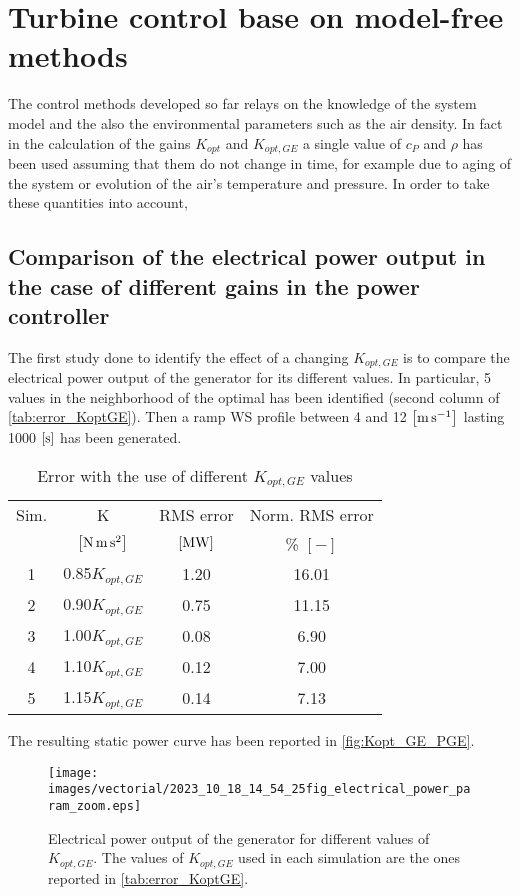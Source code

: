\section{Turbine control base on model-free methods}\label{sec:c_other_controls}
The control methods developed so far relays on the knowledge of the system model and the also the environmental parameters such as the air density. In fact in the calculation of the gains $K_{opt}$ and $K_{opt,GE}$ a single value of $c_P$ and $\rho$ has been used assuming that them do not change in time, for example due to aging of the system or evolution of the air's temperature and pressure. In order to take these quantities into account,  

\subsection{Comparison of the electrical power output in the case of different gains in the power controller}\label{subsec:c_different_KoptGE}
The first study done to identify the effect of a changing $K_{opt,GE}$ is to compare the electrical power output of the generator for its  different values. In particular, 5 values in the neighborhood of the optimal has been identified (second column of \autoref{tab:error_KoptGE}). Then a ramp WS profile between 4 and 12 $\left[\si{\meter\per\second}\right]$ lasting 1000 $\left[\si{\second}\right]$ has been generated.
\begin{table}[htb]
  \centering
  \begin{tabular}{cc|cc}
  \toprule
  Sim. & K & RMS error & Norm. RMS error\\ 
   &  $\left[\si{\newton \meter \square \second}\right]$ & $\left[\si{\mega\watt}\right]$ & \% $\left[-\right]$ \\ \midrule
  1 & 0.85$K_{opt,GE}$  & 1.20 & 16.01\\
  2 & 0.90$K_{opt,GE}$  & 0.75 & 11.15\\
  3 & 1.00$K_{opt,GE}$  & 0.08 & 6.90\\
  4 & 1.10$K_{opt,GE}$  & 0.12 & 7.00\\
  5 & 1.15$K_{opt,GE}$  & 0.14 & 7.13\\ \bottomrule
  \end{tabular}
  \caption{Error with the use of different $K_{opt,GE}$ values}
  \label{tab:error_KoptGE}
  \end{table}

The resulting static power curve has been reported in \autoref{fig:Kopt_GE_PGE}.
\begin{figure}
  \centering
  \texttt{[image: images/vectorial/2023\_10\_18\_14\_54\_25fig\_electrical\_power\_param\_zoom.eps]}
  \caption{Electrical power output of the generator for different values of $K_{opt,GE}$. The values of $K_{opt,GE}$ used in each simulation are the ones reported in \autoref{tab:error_KoptGE}.}
  \label{fig:Kopt_GE_PGE}
\end{figure}

